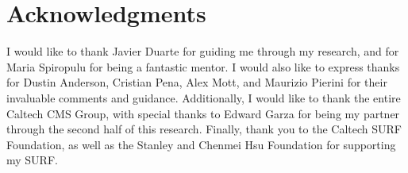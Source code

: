 \documentclass[twocolumn,aps,prd,reprint]{revtex4-1}
\begin{document}
\section{Acknowledgments}
I would like to thank Javier Duarte for guiding me through my research, and for Maria Spiropulu for being a fantastic mentor. I would also like to express thanks for Dustin Anderson, Cristian Pena, Alex Mott, and Maurizio Pierini for their invaluable comments and guidance. Additionally, I would like to thank the entire Caltech CMS Group, with special thanks to Edward Garza for being my partner through the second half of this research. Finally, thank you to the Caltech SURF Foundation, as well as the Stanley and Chenmei Hsu Foundation for supporting my SURF. 
 
\end{document}
